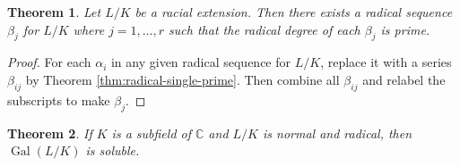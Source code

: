 \documentclass[12pt]{article}
\newtheorem{theorem}{Theorem}
\theoremstyle{definition}
\newcommand{\Gal}{\operatorname{Gal}}
\begin{document}
\begin{theorem} \label{thm:radical-all-prime}
    Let $L / K$ be a racial extension. Then there exists a radical sequence $\beta_j$ for $L / K$ where $j=1, \dots, r$ such that the radical degree of each $\beta_j$ is prime.
\end{theorem}

\begin{proof}
    For each $\alpha_i$ in any given radical sequence for $L / K$, replace it with a series $\beta_{ij}$ by Theorem \ref{thm:radical-single-prime}. Then combine all $\beta_{ij}$ and relabel the subscripts to make $\beta_{j}$. 
\end{proof}

\begin{theorem} \label{thm:radical-3}
If $K$ is a subfield of $\mathbb{C}$ and $L / K$ is normal and radical, then $\Gal(L / K)$ is soluble.
\end{theorem}
\end{document}
